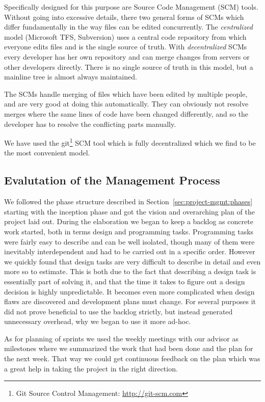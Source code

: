 Specifically designed for this purpose are Source Code Management (SCM)
tools. Without going into excessive details, there two general forms of SCMs
which differ fundamentally in the way files can be edited concurrently. The
\textit{centralized} model (Microsoft TFS, Subversion) uses a central code
repository from which everyone edits files and is the single source of
truth. With \textit{decentralized} SCMs every developer has her own repository
and can merge changes from servers or other developers directly. There is no
single source of truth in this model, but a mainline tree is almost always
maintained.

The SCMs handle merging of files which have been edited by multiple people, and
are very good at doing this automatically. They can obviously not resolve merges
where the same lines of code have been changed differently, and so the developer
has to resolve the conflicting parts manually.

We have used the git\footnote{Git Source Control Management:
  \url{http://git-scm.com}} SCM tool which is fully decentralized which we find
to be the most convenient model.

\subsection{Evalutation of the Management Process}

We followed the phase structure described in
Section~\ref{sec:project-mgmt:phases} starting with the inception phase and got
the vision and overarching plan of the project laid out. During the elaboration
we began to keep a backlog as concrete work started, both in terms design and
programming tasks. Programming tasks were fairly easy to describe and can be
well isolated, though many of them were inevitably interdependent and had to be
carried out in a specific order. However we quickly found that design tasks are
very difficult to describe in detail and even more so to estimate. This is both
due to the fact that describing a design task is essentially part of solving it,
and that the time it takes to figure out a design decision is highly
unpredictable. It becomes even more complicated when design flaws are discovered
and development plans must change. For several purposes it did not prove
beneficial to use the backlog strictly, but instead generated unnecessary
overhead, why we began to use it more ad-hoc.

As for planning of sprints we used the weekly meetings with our advisor as
milestones where we summarized the work that had been done and the plan for the
next week. That way we could get continuous feedback on the plan which was a
great help in taking the project in the right direction.

